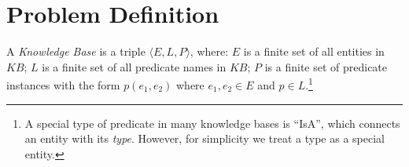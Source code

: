 \section{Problem Definition}
\label{sec:problem}


\begin{definition}
A {\em Knowledge Base} is a triple $\langle E, L, P\rangle$, where:
$E$ is a finite set of all entities in $KB$;
$L$ is a finite set of all predicate names in $KB$;
$P$ is a finite set of predicate instances with the form
$p(e_1, e_2)$ where $e_1, e_2 \in E$ and $p \in L$.\footnote{A special
type of predicate in many knowledge bases is ``IsA'', which connects an
entity with its {\em type}. However, for simplicity we treat a type as a
special entity.}
\end{definition}



